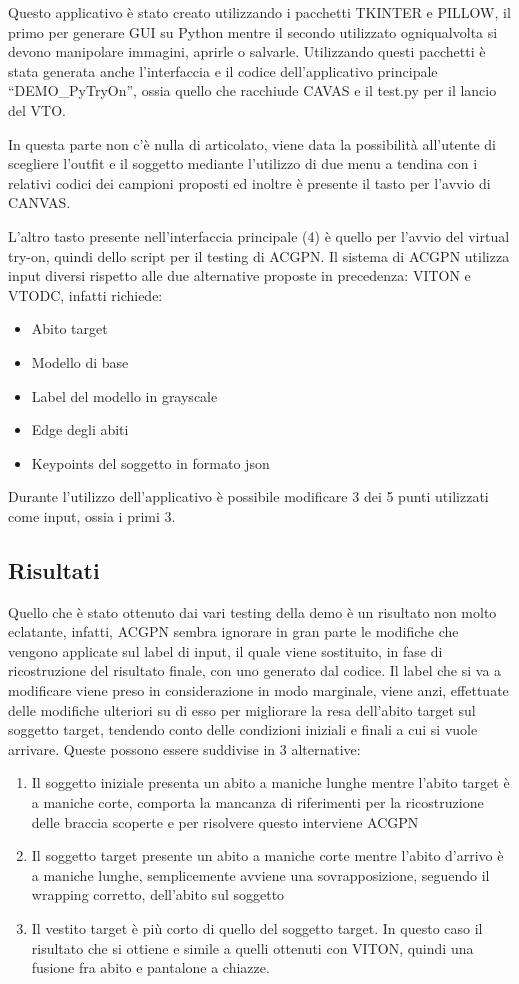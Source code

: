 \documentclass[final, 11pt]{article}
\begin{document}
	Questo applicativo è stato creato utilizzando i pacchetti TKINTER e PILLOW, il primo per generare GUI su Python mentre il secondo utilizzato ogniqualvolta si devono manipolare immagini, aprirle o salvarle.
	Utilizzando questi pacchetti è stata generata anche l’interfaccia e il codice dell’applicativo principale “DEMO\_PyTryOn”, ossia quello che racchiude CAVAS e il test.py per il lancio del VTO.
	
	In questa parte non c’è nulla di articolato, viene data la possibilità all’utente di scegliere l’outfit e il soggetto mediante l’utilizzo di due menu a tendina con i relativi codici dei campioni proposti ed inoltre è presente il tasto per l’avvio di CANVAS.
	
	L’altro tasto presente nell’interfaccia principale (4) è quello per l’avvio del virtual try-on, quindi dello script per il testing di ACGPN.
	Il sistema di ACGPN utilizza input diversi rispetto alle due alternative proposte in precedenza: VITON e VTODC, infatti richiede:
	\begin{itemize}
		\item Abito target
		\item Modello di base
		\item Label del modello in grayscale
		\item Edge degli abiti
		\item Keypoints del soggetto in formato json
	\end{itemize}
	Durante l’utilizzo dell’applicativo è possibile modificare 3 dei 5 punti utilizzati come input, ossia i primi 3.
	
	\subsection{Risultati}
	Quello che è stato ottenuto dai vari testing della demo è un risultato non molto eclatante, infatti, ACGPN sembra ignorare in gran parte le modifiche che vengono applicate sul label di input, il quale viene sostituito, in fase di ricostruzione del risultato finale, con uno generato dal codice.
	Il label che si va a modificare viene preso in considerazione in modo marginale, viene anzi, effettuate delle modifiche ulteriori su di esso per migliorare la resa dell’abito target sul soggetto target, tendendo conto delle condizioni iniziali e finali a cui si vuole arrivare. 
	Queste possono essere suddivise in 3 alternative:
	\begin{enumerate}
		\item Il soggetto iniziale presenta un abito a maniche lunghe mentre l’abito target è a maniche corte, comporta la mancanza di riferimenti per la ricostruzione delle braccia scoperte e per risolvere questo interviene ACGPN
		\item Il soggetto target presente un abito a maniche corte mentre l’abito d’arrivo è a maniche lunghe, semplicemente avviene una sovrapposizione, seguendo il wrapping corretto, dell’abito sul soggetto
		\item Il vestito target è più corto di quello del soggetto target. In questo caso il risultato che si ottiene e simile a quelli ottenuti con VITON, quindi una fusione fra abito e pantalone a chiazze.
	\end{enumerate}
	
\end{document}
